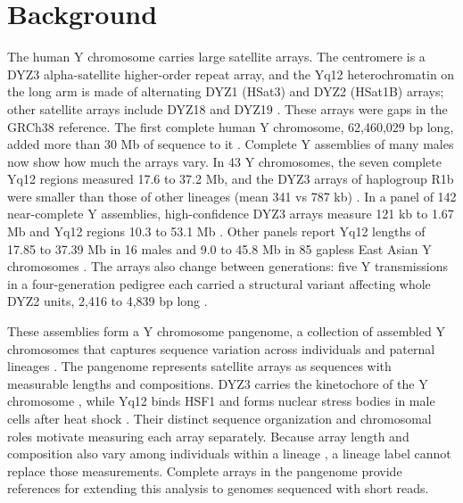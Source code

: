 \documentclass[pdflatex,sn-nature]{sn-jnl}
\begin{document}
\section{Background}\label{sec:background}

The human Y chromosome carries large satellite arrays. The centromere is a DYZ3 alpha-satellite higher-order repeat array, and the Yq12 heterochromatin on the long arm is made of alternating DYZ1 (HSat3) and DYZ2 (HSat1B) arrays; other satellite arrays include DYZ18 and DYZ19 \cite{Rhie2023,Hallast2023}. These arrays were gaps in the GRCh38 reference. The first complete human Y chromosome, 62,460,029 bp long, added more than 30 Mb of sequence to it \cite{Rhie2023}. Complete Y assemblies of many males now show how much the arrays vary. In 43 Y chromosomes, the seven complete Yq12 regions measured 17.6 to 37.2 Mb, and the DYZ3 arrays of haplogroup R1b were smaller than those of other lineages (mean 341 vs 787 kb) \cite{Hallast2023}. In a panel of 142 near-complete Y assemblies, high-confidence DYZ3 arrays measure 121 kb to 1.67 Mb and Yq12 regions 10.3 to 53.1 Mb \cite{Hallast2026}. Other panels report Yq12 lengths of 17.85 to 37.39 Mb in 16 males \cite{Logsdon2025} and 9.0 to 45.8 Mb in 85 gapless East Asian Y chromosomes \cite{Liu2026}. The arrays also change between generations: five Y transmissions in a four-generation pedigree each carried a structural variant affecting whole DYZ2 units, 2,416 to 4,839 bp long \cite{Porubsky2025}.

These assemblies form a Y chromosome pangenome, a collection of assembled Y chromosomes that captures sequence variation across individuals and paternal lineages \cite{Liao2023,Hallast2026}. The pangenome represents satellite arrays as sequences with measurable lengths and compositions. DYZ3 carries the kinetochore of the Y chromosome \cite{Jain2018}, while Yq12 binds HSF1 and forms nuclear stress bodies in male cells after heat shock \cite{Penin2021}. Their distinct sequence organization and chromosomal roles motivate measuring each array separately. Because array length and composition also vary among individuals within a lineage \cite{Hallast2026}, a lineage label cannot replace those measurements. Complete arrays in the pangenome provide references for extending this analysis to genomes sequenced with short reads.
\end{document}
